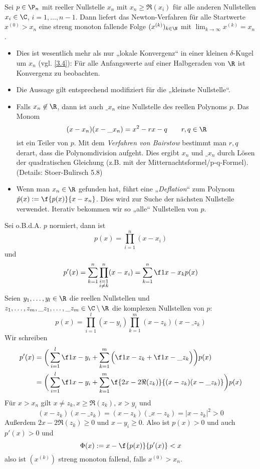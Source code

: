 \documentclass[11pt]{scrbook}
\begin{document}
\begin{st} \label{3.7}
	Sei $p\in \P_n$ mit reeller Nullstelle $x_n$ mit $x_n \ge \Re(x_i)$ für alle anderen Nullstellen $x_i \in \C$, $i=1,\dotsc,n-1$.
	Dann liefert das Newton-Verfahren für alle Startwerte $x^{(0)} > x_n$ eine streng monoton fallende Folge $(x^{(k)})_{k\in\N}$ mit $\lim_{k\to\infty} x^{(k)} = x_n$.
	\begin{note}
		\begin{itemize}
			\item
				Dies ist wesentlich mehr als nur „lokale Konvergenz“ in einer kleinen $\delta$-Kugel um $x_n$ (vgl. \ref{3.4}):
				Für alle Anfangswerte auf einer Halbgeraden von $\R$ ist Konvergenz zu beobachten.
			\item
				Die Aussage gilt entsprechend modifiziert für die „kleinste Nullstelle“.
			\item
				Falls $x_n \not\in \R$, dann ist auch $\_{x_n}$ eine Nullstelle des reellen Polynoms $p$.
				Das Monom
				\[
					(x-x_n)(x-\_{x_n}) = x^2 - rx - q
					\qquad r,q \in \R
				\]
				ist ein Teiler von $p$.
				Mit dem \emph{Verfahren von Bairstow} bestimmt man $r,q$ derart, dass die Polynomdivision aufgeht.
				Dies ergibt $x_n$ und $\_{x_n}$ durch Lösen der quadratischen Gleichung (z.B. mit der Mitternachtsformel/p-q-Formel).
				(Details: Stoer-Bulirsch 5.8)
			\item
				Wenn man $x_n \in \R$ gefunden hat, führt eine „\emph{Deflation}“ zum Polynom $\hat p(x) := \f {p(x)}{x-x_n}$.
				Dies wird zur Suche der nächsten Nullstelle verwendet.
				Iterativ bekommen wir so „alle“ Nullstellen von $p$.
		\end{itemize}
	\end{note}
	\begin{note}
		Sei o.B.d.A. $p$ normiert, dann ist
		\[
			p(x) = \prod_{i=1}^n (x-x_i)
		\]
		und
		\[
			p'(x) = \sum_{k=1}^n \prod_{\substack{i=1 \\ i\neq k}}^n (x-x_i) = \sum_{k=1}^n \f 1{x-x_k} p(x)
		\]
		Seien $y_1,\dotsc,y_l \in \R$ die reellen Nullstellen und $z_1,\dotsc,z_m,\_{z_1}, \dotsc, \_{z_m} \in \C \setminus \R$ die komplexen Nullstellen von $p$:
		\[
			p(x) = \prod_{i=1}^l (x-y_i)\prod_{k=1}^m (x-z_k)(x-\_{z_k})
		\]
		Wir schreiben
		\begin{align*}
			p'(x)  
			&= \bigg( \sum_{i=1}^l \f 1{x-y_i} + \sum_{k=1}^m \Big(\f 1{x-z_k} + \f 1{x-\_{z_k}}\Big) \bigg) p(x) \\
			&= \bigg( \sum_{i=1}^l \f 1{x-y_i} + \sum_{k=1}^m \f {2x - 2\Re(z_k)}{(x-z_k)(x-\_{z_k})}\bigg) p(x)
		\end{align*}
		Für $x>x_n$ gilt $x\neq z_k, x\ge \Re(z_k)$, $x > y_i$ und
		\[
			(x-z_k)(x-\_{z_k}) 
			= (x-z_k)(\_{x-z_k})
			= |x-z_k|^2
			> 0
		\]
		Außerdem $2x-2\Re(z_k) \ge 0$ und $x-y_i \ge 0$.
		Also ist $p(x) > 0$ und auch $p'(x) > 0$ und
		\[
			\Phi(x) := x - \f {p(x)}{p'(x)} < x
		\]
		also ist $(x^{(k)})$ streng monoton fallend, falls $x^{(0)} > x_n$.


\end{note}
\end{st}
\end{document}
